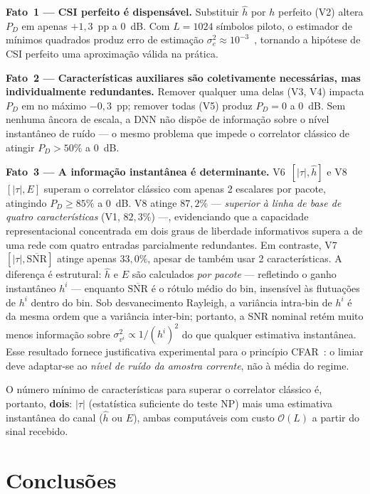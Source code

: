 \documentclass{sbrt}
\begin{document}
\textbf{Fato~1 — CSI perfeito é dispensável.} Substituir $\hat{h}$ por $h$ perfeito (V2) altera $P_D$ em apenas $+1{,}3$~pp a 0~dB. Com $L = 1024$ símbolos piloto, o estimador de mínimos quadrados produz erro de estimação $\sigma_e^2 \approx 10^{-3}$~\cite{ref_kay}, tornando a hipótese de CSI perfeito uma aproximação válida na prática.

\textbf{Fato~2 — Características auxiliares são coletivamente necessárias, mas individualmente redundantes.} Remover qualquer uma delas (V3, V4) impacta $P_D$ em no máximo $-0{,}3$~pp; remover todas (V5) produz $P_D = 0$ a 0~dB. Sem nenhuma âncora de escala, a DNN não dispõe de informação sobre o nível instantâneo de ruído — o mesmo problema que impede o correlator clássico de atingir $P_D > 50\%$ a 0~dB.

\textbf{Fato~3 — A informação instantânea é determinante.} V6~$[|\tau|, \hat{h}]$ e V8~$[|\tau|, E]$ superam o correlator clássico com apenas 2 escalares por pacote, atingindo $P_D \geq 85\%$ a 0~dB. V8 atinge $87{,}2\%$ — \emph{superior à linha de base de quatro características} (V1, $82{,}3\%$) —, evidenciando que a capacidade representacional concentrada em dois graus de liberdade informativos supera a de uma rede com quatro entradas parcialmente redundantes. Em contraste, V7~$[|\tau|, \overline{\text{SNR}}]$ atinge apenas $33{,}0\%$, apesar de também usar 2 características. A diferença é estrutural: $\hat{h}$ e $E$ são calculados \emph{por pacote} — refletindo o ganho instantâneo $h^i$ — enquanto $\overline{\text{SNR}}$ é o rótulo médio do bin, insensível às flutuações de $h^i$ dentro do bin. Sob desvanecimento Rayleigh, a variância intra-bin de $h^i$ é da mesma ordem que a variância inter-bin; portanto, a SNR nominal retém muito menos informação sobre $\sigma_{v^i}^2 \propto 1/(h^i)^2$ do que qualquer estimativa instantânea. Esse resultado fornece justificativa experimental para o princípio CFAR~\cite{ref_poor}: o limiar deve adaptar-se ao \emph{nível de ruído da amostra corrente}, não à média do regime.

O número mínimo de características para superar o correlator clássico é, portanto, \textbf{dois}: $|\tau|$ (estatística suficiente do teste NP) mais uma estimativa instantânea do canal ($\hat{h}$ ou $E$), ambas computáveis com custo $\mathcal{O}(L)$ a partir do sinal recebido.


\section{Conclusões}
\end{document}
